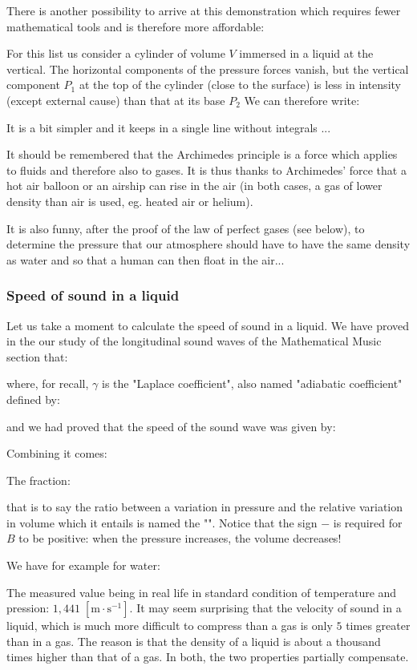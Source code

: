 	There is another possibility to arrive at this demonstration which requires fewer mathematical tools and is therefore more affordable:
	
	For this list us consider a cylinder of volume $V$ immersed in a liquid at the vertical. The horizontal components of the pressure forces vanish, but the vertical component $P_1$ at the top of the cylinder (close to the surface) is less in intensity (except external cause) than that at its base $P_2$ We can therefore write:
	
	It is a bit simpler and it keeps in a single line without integrals ...

	It should be remembered that the Archimedes principle is a force which applies to fluids and therefore also to gases. It is thus thanks to Archimedes' force that a hot air balloon or an airship can rise in the air (in both cases, a gas of lower density than air is used, eg. heated air or helium).

	It is also funny, after the proof of the law of perfect gases (see below), to determine the pressure that our atmosphere should have to have the same density as water and so that a human can then float in the air...
	
	\subsubsection{Speed of sound in a liquid}
	Let us take a moment to calculate the speed of sound in a liquid. We have proved in the our study of the longitudinal sound waves of the Mathematical Music section that:
	
	where, for recall, $\gamma$ is the "Laplace coefficient", also named "adiabatic coefficient" defined by:
	
	and we had proved that the speed of the sound wave was given by:
	
	Combining it comes:
	
	The fraction:
	
	that is to say the ratio between a variation in pressure and the relative variation in volume which it entails is named the "". Notice that the sign $-$ is required for $B$ to be positive: when the pressure increases, the volume decreases!

	We have for example for water:
	
	The measured value being in real life in standard condition of temperature and pression: $1,441\;[\text{m}\cdot \text{s}^{-1}]$. It may seem surprising that the velocity of sound in a liquid, which is much more difficult to compress than a gas is only $5$ times greater than in a gas. The reason is that the density of a liquid is about a thousand times higher than that of a gas. In both, the two properties partially compensate.
	
